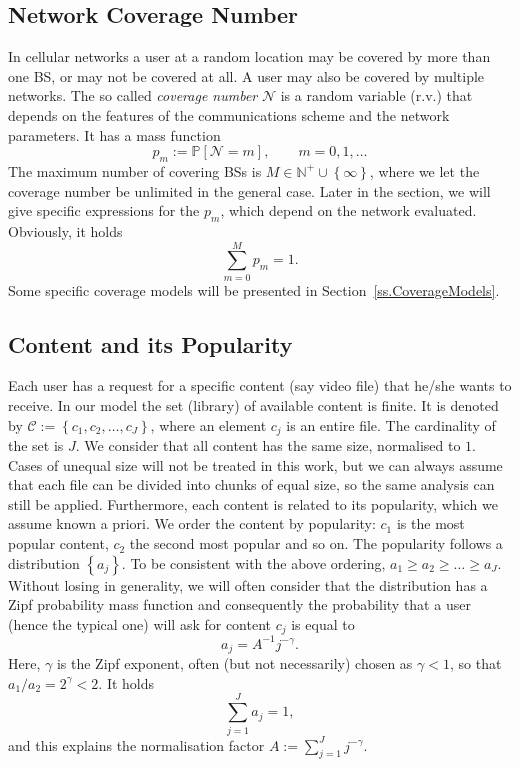 \documentclass[conference,twocolum,final]{IEEEtran}
\begin{document}
\subsection{Network Coverage Number}
In cellular networks a user at a random location may be covered by more than one BS, or may not be covered at all. A user may also be covered by multiple networks. The so called \textit{coverage number} $\mathcal{N}$ is a random variable (r.v.) \cite{KeelerBartek13} that depends on the features of the communications scheme and the network parameters. It has a mass function
\begin{equation}
\label{CovNum}
p_m:=\mathbb{P}\left[\mathcal{N}=m\right],\qquad m=0,1,\ldots
\end{equation}
The maximum number of covering BSs is
$M\in\mathbb{N}^+\cup\left\{\infty\right\}$, where we let the coverage
number be unlimited in the general case. Later in the section, we will
give specific expressions for the $p_m$, which depend on the network
evaluated.  Obviously, it holds
\begin{equation}
\label{SumPm}
\sum_{m=0}^{M} p_m = 1.
\end{equation}
Some specific coverage models will be presented in Section~\ref{ss.CoverageModels}.

\subsection{Content and its Popularity}
Each user has a request for a specific content (say video file) that he/she wants to receive. In our model the set (library) of available content is finite. It is denoted by $\mathcal{C}:=\left\{c_1,c_2,\ldots,c_J\right\}$, where an element $c_j$ is an entire file. The cardinality of the set is $J$. We consider that all content has the same size, normalised to $1$.  Cases of unequal size will not be treated in this work, but we can always assume that each file can be divided into chunks of equal size, so the same analysis can still be applied. 
Furthermore, each content is related to its popularity, which we assume known a priori. We order the content by popularity: $c_1$ is the most popular content, $c_2$ the second most popular and so on. The popularity follows a distribution $\left\{a_j\right\}$. To be consistent with the above ordering, $a_1\geq a_2\geq \ldots\geq a_J$. Without losing in generality, we will often consider that the distribution has a Zipf probability mass function and consequently the probability that a user (hence the typical one) will ask for content $c_j$ is equal to 
\begin{equation}
\label{PMFzipf}
a_j  =  A^{-1}j^{-\gamma}.
\end{equation}
Here, $\gamma$ is the Zipf exponent, often (but not necessarily) chosen as $\gamma<1$, so that $a_1/a_2=2^{\gamma}<2$. It holds 
\begin{equation}
\label{sumAJ}
\sum_{j=1}^{J}a_j  =  1,
\end{equation}
and this explains the normalisation factor $A:=\sum_{j=1}^{J} j^{-\gamma}$. 
\end{document}
